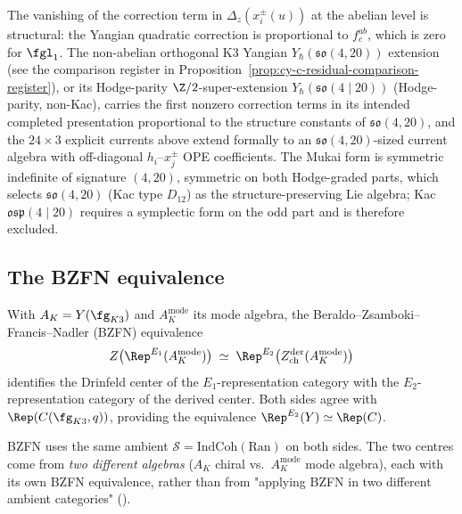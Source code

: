 \begin{remark}
\label{rem:abelian-coproduct-no-correction}
The vanishing of the correction term in $\Delta_z(x^\pm_i(u))$ at the
abelian level is structural: the Yangian quadratic correction is
proportional to $f^{ab}_c$, which is zero for $\fgl_1$. The non-abelian
orthogonal K$3$ Yangian $Y_\hbar(\mathfrak{so}(4, 20))$ extension
(see the comparison register in
Proposition~\ref{prop:cy-c-residual-comparison-register}), or its
Hodge-parity $\Z/2$-super-extension $Y_\hbar(\mathfrak{so}(4 \mid 20))$
(Hodge-parity, non-Kac), carries the first nonzero correction
terms in its intended completed presentation
proportional to the structure constants of $\mathfrak{so}(4, 20)$,
and the $24 \times 3$ explicit currents above extend formally to an
$\mathfrak{so}(4, 20)$-sized current algebra with off-diagonal
$h_i$--$x^\pm_j$ OPE coefficients. The Mukai form is symmetric
indefinite of signature $(4, 20)$, symmetric on both Hodge-graded
parts, which selects $\mathfrak{so}(4, 20)$ (Kac type $D_{12}$) as
the structure-preserving Lie algebra; Kac $\mathfrak{osp}(4 \mid 20)$
requires a symplectic form on the odd part and is therefore excluded.
\end{remark}

\subsection{The BZFN equivalence}
\label{subsec:cy-c-bzfn}

\begin{proposition}[\texorpdfstring{$\Rep^{E_2}(Y) = \Rep(C)$}{Rep-E-2(Y) = Rep(C)} via the Drinfeld center]
\label{prop:cy-c-BZFN}
With $A_K = Y(\fg_{K3})$ and $A_K^{\mathrm{mode}}$ its mode algebra,
the Beraldo--Zsamboki--Francis--Nadler (BZFN) equivalence
\[
 Z\bigl(\Rep^{E_1}(A_K^{\mathrm{mode}})\bigr) \;\simeq\;
 \Rep^{E_2}\bigl(Z^{\mathrm{der}}_{\mathrm{ch}}(A_K^{\mathrm{mode}})\bigr)
\]
identifies the Drinfeld center of the $E_1$-representation category with
the $E_2$-representation category of the derived center. Both sides
agree with $\Rep(C(\fg_{K3}, q))$, providing the equivalence
$\Rep^{E_2}(Y) \simeq \Rep(C)$.
\end{proposition}

\begin{remark}
\label{rem:bzfn-ambient-fixed}
BZFN uses the same ambient $\mathcal{S} = \mathrm{IndCoh}(\mathrm{Ran})$
on both sides. The two centres come from \emph{two different
algebras} ($A_K$ chiral vs.\ $A_K^{\mathrm{mode}}$ mode algebra), each
with its own BZFN equivalence, rather than from "applying BZFN in two
different ambient categories" \textup{(}\textup{).}
\end{remark}

